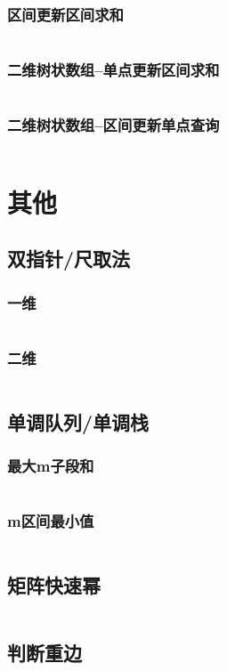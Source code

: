 \documentclass[a4paper,11pt]{article}
\begin{document}
\subsubsection{区间更新区间求和}
\inputminted[]{c++}{Template/Segment/TreeArrayIII.cpp}
\subsubsection{二维树状数组--单点更新区间求和}
\inputminted[]{c++}{Template/Segment/TwoDimTreeArrayI.cpp}
\subsubsection{二维树状数组--区间更新单点查询}
\inputminted[]{c++}{Template/Segment/TwoDimTreeArrayII.cpp}
\section{其他}
\subsection{双指针/尺取法}
\subsubsection{一维}
\inputminted[]{c++}{Template/Other/TwoPointer.cpp}
\subsubsection{二维}
\inputminted[]{c++}{Template/Other/TwoDimTwoPointer.cpp}
\subsection{单调队列/单调栈}
\subsubsection{最大m子段和}
\inputminted[]{c++}{Template/Other/MonotonicQueueI.cpp}
\subsubsection{m区间最小值}
\inputminted[]{c++}{Template/Other/MonotonicQueueII.cpp}
\subsection{矩阵快速幂}
\inputminted[]{c++}{Template/Other/FastMat.cpp}
\subsection{判断重边}
\inputminted[]{c++}{Template/Other/Edge-Judge-Repeat.cpp}
\end{document}
